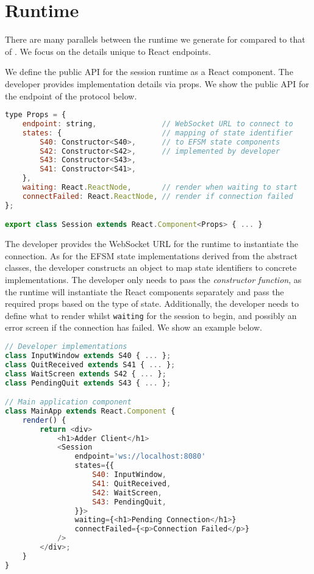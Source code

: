 \section{Runtime}
\label{section:reactruntime}

There are many parallels between the runtime we generate
for \reactcodegen compared to that of \nodecodegen.
We focus on the details unique to React endpoints.

We define the public API for the session runtime
as a React component. The developer provides implementation details via
props.
We show the public API for the  endpoint
of the  protocol below.

\begin{lstlisting}[language=javascript]
type Props = {
	endpoint: string,				// WebSocket URL to connect to
	states: {						// mapping of state identifier
		S40: Constructor<S40>,		// to EFSM state components
		S42: Constructor<S42>,		// implemented by developer
		S43: Constructor<S43>,
		S41: Constructor<S41>,
	},
	waiting: React.ReactNode,		// render when waiting to start
	connectFailed: React.ReactNode,	// render if connection failed
};

export class Session extends React.Component<Props> { ... }
\end{lstlisting}

The developer provides the WebSocket URL for the runtime
to instantiate the connection.
As for the EFSM state implementations derived from the abstract
classes, the developer constructs an object to map state identifiers
to concrete implementations. 
The developer only needs to pass the \textit{constructor function},
as the runtime will instantiate the React components separately
and pass the required props based on the type of state.
Additionally, the developer needs to define what to render
whilst \texttt{waiting} for the session to begin, and possibly
an error screen if the connection has failed.
We show an example below.

\begin{lstlisting}[language=javascript,tabsize=2]
// Developer implementations
class InputWindow extends S40 { ... };
class QuitReceived extends S41 { ... };
class WaitScreen extends S42 { ... };
class PendingQuit extends S43 { ... };

// Main application component
class MainApp extends React.Component {
	render() {
		return <div>
			<h1>Adder Client</h1>
			<Session
				endpoint='ws://localhost:8080'
				states={{
					S40: InputWindow,
					S41: QuitReceived,
					S42: WaitScreen,
					S43: PendingQuit,		
				}}>
				waiting={<h1>Pending Connection</h1>}
				connectFailed={<p>Connection Failed</p>}
			/>
		</div>;
	}
}
\end{lstlisting}

